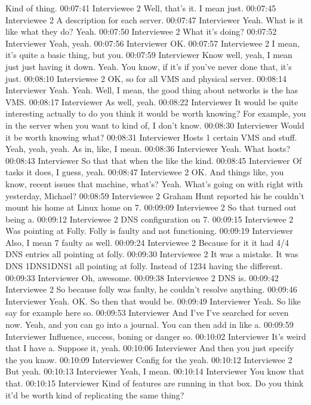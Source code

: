 Kind of thing.
00:07:41 Interviewee 2 
Well, that's it. I mean just.
00:07:45 Interviewee 2 
A description for each server.
00:07:47 Interviewer
Yeah. What is it like what they do? Yeah.
00:07:50 Interviewee 2 
What it's doing?
00:07:52 Interviewer
Yeah, yeah.
00:07:56 Interviewer
OK.
00:07:57 Interviewee 2 
I mean, it's quite a basic thing, but you.
00:07:59 Interviewer
Know well, yeah, I mean just just having it down. Yeah. You know, if it's if you've never done that, it's just.
00:08:10 Interviewee 2 
OK, so for all VMS and physical server.
00:08:14 Interviewer
Yeah. Yeah. Well, I mean, the good thing about networks is the has VMS.
00:08:17 Interviewer
As well, yeah.
00:08:22 Interviewer
It would be quite interesting actually to do you think it would be worth knowing? For example, you in the server when you want to kind of, I don't know.
00:08:30 Interviewer
Would it be worth knowing what?
00:08:31 Interviewer
Hosts 1 certain VMS and stuff. Yeah, yeah, yeah. As in, like, I mean.
00:08:36 Interviewer
Yeah. What hosts?
00:08:43 Interviewer
So that that when the like the kind.
00:08:45 Interviewer
Of tasks it does, I guess, yeah.
00:08:47 Interviewee 2 
OK. And things like, you know, recent issues that machine, what's? Yeah. What's going on with right with yesterday, Michael?
00:08:59 Interviewee 2 
Graham Hunt reported his he couldn't mount his home at Linux home on 7.
00:09:09 Interviewee 2 
So that turned out being a.
00:09:12 Interviewee 2 
DNS configuration on 7.
00:09:15 Interviewee 2 
Was pointing at Folly. Folly is faulty and not functioning.
00:09:19 Interviewer
Also, I mean 7 faulty as well.
00:09:24 Interviewee 2 
Because for it it had 4/4 DNS entries all pointing at folly.
00:09:30 Interviewee 2 
It was a mistake. It was DNS 1DNS1DNS1 all pointing at folly. Instead of 1234 having the different.
00:09:33 Interviewer
Oh, awesome.
00:09:38 Interviewee 2 
DNS is.
00:09:42 Interviewee 2 
So because folly was faulty, he couldn't resolve anything.
00:09:46 Interviewer
Yeah. OK. So then that would be.
00:09:49 Interviewer
Yeah. So like say for example here so.
00:09:53 Interviewer
And I've I've searched for seven now. Yeah, and you can go into a journal. You can then add in like a.
00:09:59 Interviewer
Influence, success, boning or danger so.
00:10:02 Interviewer
It's weird that I have a. Suppose it, yeah.
00:10:06 Interviewer
And then you just specify the you know.
00:10:09 Interviewer
Config for the yeah.
00:10:12 Interviewee 2 
But yeah.
00:10:13 Interviewer
Yeah, I mean.
00:10:14 Interviewer
You know that that.
00:10:15 Interviewer
Kind of features are running in that box. Do you think it'd be worth kind of replicating the same thing?
